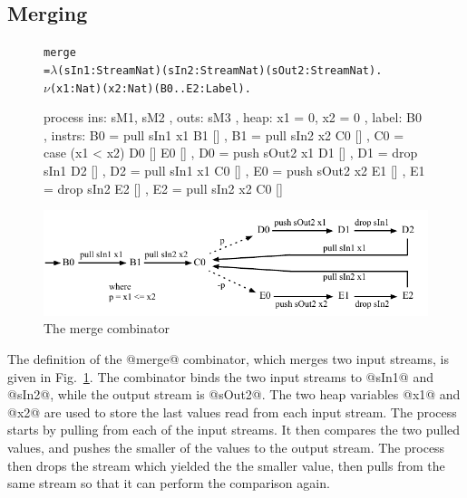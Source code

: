 \subsection{Merging}
\begin{figure}
\begin{alltt}
               merge
                 = \(\lambda\) (sIn1: Stream Nat) (sIn2: Stream Nat) (sOut2: Stream Nat). 
                   \(\nu\) (x1: Nat) (x2: Nat) (B0..E2: Label).
\end{alltt}
\begin{code}
                   process
                    { ins:    { sM1, sM2 }
                    , outs:   { sM3 }
                    , heap:   { x1 = 0, x2 = 0 }
                    , label:  B0
                    , instrs: { B0 = pull sIn1  x1   B1 []
                              , B1 = pull sIn2  x2   C0 []
                              , C0 = case (x1 < x2)  D0 []  E0 []
                              , D0 = push sOut2 x1   D1 []
                              , D1 = drop sIn1       D2 []
                              , D2 = pull sIn1  x1   C0 []
                              , E0 = push sOut2 x2   E1 []
                              , E1 = drop sIn2       E2 []
                              , E2 = pull sIn2 x2    C0 [] } }
\end{code}

\medskip
\includegraphics[scale=1.1]{figures/state-merge.pdf}
\caption{The merge combinator}
\label{fig:Process:Merge}
\end{figure}

The definition of the @merge@ combinator, which merges two input streams, is given in Fig.~\ref{fig:Process:Merge}. The combinator binds the two input streams to @sIn1@ and @sIn2@, while the output stream is @sOut2@. The two heap variables @x1@ and @x2@ are used to store the last values read from each input stream. The process starts by pulling from each of the input streams. It then compares the two pulled values, and pushes the smaller of the values to the output stream. The process then drops the stream which yielded the the smaller value, then pulls from the same stream so that it can perform the comparison again.

